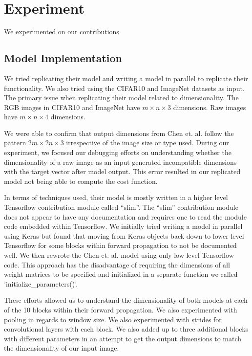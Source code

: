\documentclass{article}
\begin{document}
\section{Experiment}

We experimented on our contributions

\subsection{Model Implementation}

We tried replicating their model and writing a model in parallel to
replicate their functionality. We also tried using the CIFAR10 and
ImageNet datasets as input. The primary issue when replicating their
model related to dimensionality. The RGB images in CIFAR10 and ImageNet
have $m \times n \times 3$ dimensions. Raw images have $m \times n \times 4$
dimensions.

We were able to confirm that output dimensions from Chen et. al.
\cite{chen2018learning} follow the pattern $2m \times 2n \times 3$
irrespective of the image size or type used. During our experiment,
we focused our debugging efforts on understanding whether the dimensionality
of a raw image as an input generated incompatible dimensions with the
target vector after model output. This error resulted in our replicated
model not being able to compute the cost function.

In terms of techniques used, their model is mostly written in a higher
level Tensorflow contribution module called ``slim''. The ``slim''
contribution module does not appear to have any documentation and requires
one to read the module code embedded within Tensorflow. We initially tried
writing a model in parallel using Keras but found that moving from Keras
objects back down to lower level Tensorflow for some blocks within
forward propagation to not be documented well. We then rewrote the
Chen et. al. \cite{chen2018learning} model using only low level Tensorflow
code. This approach has the disadvantage of requiring the dimensions of
all weight matrices to be specified and initialized in a separate function
we called 'initialize\_parameters()'.

These efforts allowed us to understand the dimensionality of both models
at each of the 10 blocks within their forward propagation. We also
experimented with pooling in regards to window size. We also experimented
with strides for convolutional layers with each block. We also added up
to three additional blocks with different parameters in an attempt to
get the output dimensions to match the dimensionality of our input image.
\end{document}
